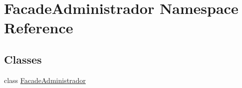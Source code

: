 \hypertarget{namespace_facade_administrador}{}\section{Facade\+Administrador Namespace Reference}
\label{namespace_facade_administrador}
\subsection*{Classes}
\begin{DoxyCompactItemize}
\item 
class \mbox{\hyperlink{class_facade_administrador_1_1_facade_administrador}{Facade\+Administrador}}
\end{DoxyCompactItemize}
